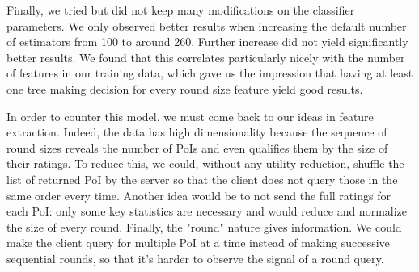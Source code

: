 \documentclass[10pt,conference,compsocconf]{IEEEtran}
\begin{document}
Finally, we tried but did not keep many modifications on the classifier parameters. We only observed better results when increasing the default number of estimators from 100 to around 260. Further increase did not yield significantly better results. We found that this correlates particularly nicely with the number of features in our training data, which gave us the impression that having at least one tree making decision for every round size feature yield good results.

In order to counter this model, we must come back to our ideas in feature extraction. Indeed, the data has high dimensionality because the sequence of round sizes reveals the number of PoIs and even qualifies them by the size of their ratings. To reduce this, we could, without any utility reduction, shuffle the list of returned PoI by the server so that the client does not query those in the same order every time. Another idea would be to not send the full ratings for each PoI: only some key statistics are necessary and would reduce and normalize the size of every round. Finally, the "round" nature gives information. We could make the client query for multiple PoI at a time instead of making successive sequential rounds, so that it's harder to observe the signal of a round query.


\end{document}
